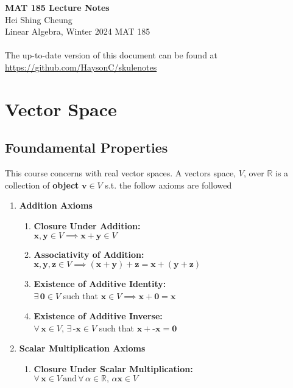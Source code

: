 \documentclass[11pt]{report}
\begin{document}
\thispagestyle{empty}
{\LARGE \bf MAT 185 Lecture Notes}\\
{\large Hei Shing Cheung}\\
Linear Algebra, Winter 2024 \hfill MAT 185\\
\\
The up-to-date version of this document can be found at \url{https://github.com/HaysonC/skulenotes}\\
\section{Vector Space}
\subsection{Foundamental Properties}
\begin{definition}
    This course concerns with real vector spaces. A vectors space, ${V}$, over $\mathbb{R}$ is a collection of \textbf{object} $\textbf{v} \in V$ s.t. the follow axioms are followed
    \begin{enumerate}
        \item \textbf{Addition Axioms}
        \begin{enumerate}
            \item \textbf{Closure Under Addition:} \\
            $\textbf{x}, \textbf{y} \in V \implies \textbf{x} + \textbf{y} \in V$
            
            \item \textbf{Associativity of Addition:} \\
            $\textbf{x}, \textbf{y}, \textbf{z} \in V \implies (\textbf{x} + \textbf{y}) + \textbf{z} = \textbf{x} + (\textbf{y} + \textbf{z})$
            
            \item \textbf{Existence of Additive Identity:} \\
            $\exists \, \textbf{0} \in V$ such that $\textbf{x} \in V \implies \textbf{x} + \textbf{0} = \textbf{x}$
            
            \item \textbf{Existence of Additive Inverse:} \\
            $\forall \, \textbf{x} \in V, \, \exists \, \textbf{-x} \in V$ such that $\textbf{x} + \textbf{-x} = \textbf{0}$
        \end{enumerate}
        
        \item \textbf{Scalar Multiplication Axioms}
        \begin{enumerate}
            \item \textbf{Closure Under Scalar Multiplication:} \\
            $\forall \, \textbf{x} \in V \, \text{and} \, \forall \, \alpha \in \mathbb{R}, \, \alpha \textbf{x} \in V$
            

\end{enumerate}
\end{enumerate}
\end{definition}
\end{document}
